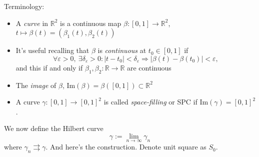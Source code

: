 \documentclass[a4paper]{article}
\theoremstyle{definition}
\begin{document}
Terminology:
\begin{itemize}
    \item A \textit{curve} in $\mathbb R^2$ is a continuous map $\beta:[0,1]\rightarrow \mathbb R^2$, $t\mapsto \beta(t)=(\beta_1(t),\beta_2(t))$
    \item It's useful recalling that $\beta$ is \textit{continuous} at $t_0\in [0,1]$ if
    \[
    \forall \varepsilon >0, \ \exists \delta_\varepsilon>0: |t-t_0|<\delta_\varepsilon \Rightarrow |\beta(t)-\beta(t_0)|<\varepsilon ,
    \]
    and this if and only if $\beta_1,\beta_2:\mathbb R\rightarrow \mathbb R$ are continuous
    \item The \textit{image} of $\beta$, $\text{Im} (\beta)=\beta([0,1])\subset \mathbb R^2$
    \item A curve $\gamma:[0,1]\rightarrow[0,1]^2$ is called \textit{space-filling} or SPC if $\text{Im}(\gamma)=[0,1]^2$.
\end{itemize}
We now define the Hilbert curve
\[
\gamma := \lim_{n\rightarrow \infty} \gamma_n
\]
where $\gamma_n \rightrightarrows \gamma$. And here's the construction. Denote unit square as $S_0$.
\end{document}
